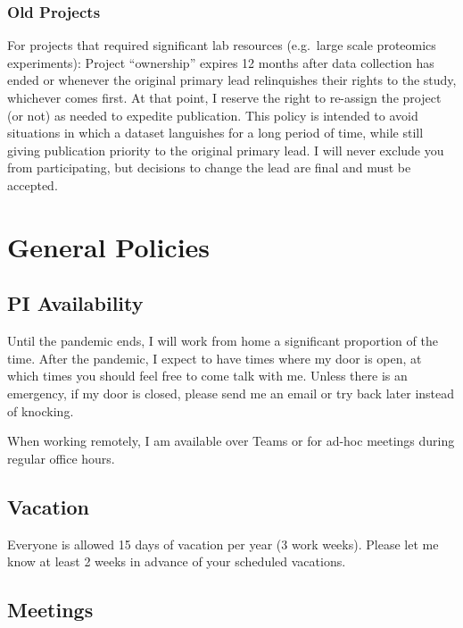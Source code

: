 \documentclass[
]{book}
\begin{document}
\hypertarget{old-projects}{%
\subsection{Old Projects}\label{old-projects}}

For projects that required significant lab resources (e.g.~large scale proteomics experiments): Project ``ownership'' expires 12 months after data collection has ended or whenever the original primary lead relinquishes their rights to the study, whichever comes first. At that point, I reserve the right to re-assign the project (or not) as needed to expedite publication. This policy is intended to avoid situations in which a dataset languishes for a long period of time, while still giving publication priority to the original primary lead. I will never exclude you from participating, but decisions to change the lead are final and must be accepted.

\hypertarget{general}{%
\chapter{General Policies}\label{general}}

\hypertarget{pi-availability}{%
\section{PI Availability}\label{pi-availability}}

Until the pandemic ends, I will work from home a significant proportion of the time. After the pandemic, I expect to have times where my door is open, at which times you should feel free to come talk with me. Unless there is an emergency, if my door is closed, please send me an email or try back later instead of knocking.

When working remotely, I am available over Teams or for ad-hoc meetings during regular office hours.

\hypertarget{vacation}{%
\section{Vacation}\label{vacation}}

Everyone is allowed 15 days of vacation per year (3 work weeks). Please let me know at least 2 weeks in advance of your scheduled vacations.

\hypertarget{meetings}{%
\section{Meetings}\label{meetings}}
\end{document}
